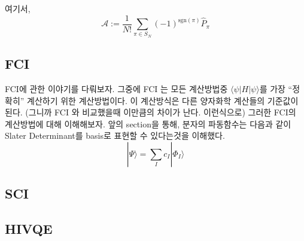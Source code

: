 \documentclass[10pt]{article}
\begin{document}
여기서, 
\[
\mathcal{A} := \frac{1}{N!} \sum_{\pi \in S_N} (-1)^{\text{sgn}(\pi)} \hat{P}_\pi
\]

\subsection{FCI}
FCI에 관한 이야기를 다뤄보자. 그중에 FCI 는 모든 계산방법중 \(\langle \psi|H|\psi \rangle\)를 가장  \enquote{정확히} 계산하기 위한 계산방법이다. 
이 계산방식은 다른 양자화학 계산들의 기준값이 된다. (그니까 FCI 와 비교했을때 이만큼의 차이가 난다. 이런식으로) 그러한 FCI의 계산방법에 대해 이해해보자. 
앞의 section을 통해, 분자의 파동함수는 다음과 같이 Slater Determinant를 basis로 표현할 수 있다는것을 이해했다. 
\[
|\Psi\rangle = \sum_I c_I |\Phi_I\rangle
\]


\subsection{SCI}

\subsection{HIVQE}
\end{document}
